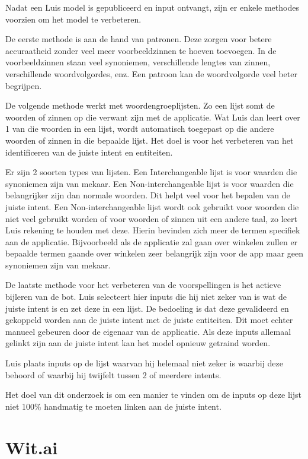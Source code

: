 Nadat een Luis model is gepubliceerd en input ontvangt, zijn er enkele methodes voorzien om het model te verbeteren.

De eerste methode is aan de hand van patronen. Deze zorgen voor betere accuraatheid zonder veel meer voorbeeldzinnen te hoeven toevoegen. In de voorbeeldzinnen staan veel synoniemen, verschillende lengtes van zinnen, verschillende woordvolgordes, enz. Een patroon kan de woordvolgorde veel beter begrijpen.

De volgende methode werkt met woordengroeplijsten. Zo een lijst somt de woorden of zinnen op die verwant zijn met de applicatie. Wat Luis dan leert over 1 van die woorden in een lijst, wordt automatisch toegepast op die andere woorden of zinnen in die bepaalde lijst. Het doel is voor het verbeteren van het identificeren van de juiste intent en entiteiten.

Er zijn 2 soorten types van lijsten. Een Interchangeable lijst is voor waarden die synoniemen zijn van mekaar. Een Non-interchangeable lijst is voor waarden die belangrijker zijn dan normale woorden. Dit helpt veel voor het bepalen van de juiste intent. Een Non-interchangeable lijst wordt ook gebruikt voor woorden die niet veel gebruikt worden of voor woorden of zinnen uit een andere taal, zo leert Luis rekening te houden met deze. Hierin bevinden zich meer de termen specifiek aan de applicatie. Bijvoorbeeld als de applicatie zal gaan over winkelen zullen er bepaalde termen gaande over winkelen zeer belangrijk zijn voor de app maar geen synoniemen zijn van mekaar.

De laatste methode voor het verbeteren van de voorspellingen is het actieve bijleren van de bot. Luis selecteert hier inputs die hij niet zeker van is wat de juiste intent is en zet deze in een lijst. De bedoeling is dat deze gevalideerd en gekoppeld worden aan de juiste intent met de juiste entiteiten. Dit moet echter manueel gebeuren door de eigenaar van de applicatie. Als deze inputs allemaal gelinkt zijn aan de juiste intent kan het model opnieuw getraind worden.

Luis plaats inputs op de lijst waarvan hij helemaal niet zeker is waarbij deze behoord of waarbij hij twijfelt tussen 2 of meerdere intents.

Het doel van dit onderzoek is om een manier te vinden om de inputs op deze lijst niet 100\% handmatig te moeten linken aan de juiste intent.

\section{Wit.ai}
\label{sec:Wit.ai}

